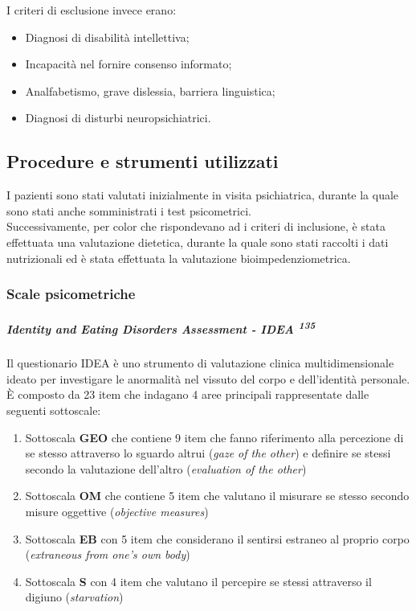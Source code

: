 \documentclass[12pt]{article}
\makeatletter
\newcommand{\cslcitation}[2]
 {\protect\hyper@linkstart{cite}{citeproc_bib_item_#1}#2\hyper@linkend}
\makeatother
\begin{document}
I criteri di esclusione invece erano:
\begin{itemize}
\item Diagnosi di disabilità intellettiva;
\item Incapacità nel fornire consenso informato;
\item Analfabetismo, grave dislessia, barriera linguistica;
\item Diagnosi di disturbi neuropsichiatrici.
\end{itemize}
\subsection{Procedure e strumenti utilizzati}
\label{sec:orgf8ba668}
I pazienti sono stati valutati inizialmente in visita psichiatrica, durante la quale sono stati anche somministrati i test psicometrici.\\
Successivamente, per color che rispondevano ad i criteri di inclusione, è stata effettuata una valutazione dietetica, durante la quale sono stati raccolti i dati nutrizionali ed è stata effettuata la valutazione bioimpedenziometrica.
\subsubsection{Scale psicometriche}
\label{sec:org03ea835}
\subparagraph{Identity and Eating Disorders Assessment - IDEA \textsuperscript{\cslcitation{135}{135}}}
\label{sec:org3f22a33}
Il questionario IDEA è uno strumento di valutazione clinica multidimensionale ideato per investigare le anormalità nel vissuto del corpo e dell'identità personale.
È composto da 23 item che indagano 4 aree principali rappresentate dalle seguenti sottoscale:
\begin{enumerate}
\item Sottoscala \textbf{GEO} che contiene 9 item che fanno riferimento alla percezione di se stesso attraverso lo sguardo altrui (\emph{gaze of the other}) e definire se stessi secondo la valutazione dell'altro (\emph{evaluation of the other})
\item Sottoscala \textbf{OM} che contiene 5 item che valutano il misurare se stesso secondo misure oggettive (\emph{objective measures})
\item Sottoscala \textbf{EB} con 5 item che considerano il sentirsi estraneo al proprio corpo (\emph{extraneous from one's own body})
\item Sottoscala \textbf{S} con 4 item che valutano il percepire se stessi attraverso il digiuno (\emph{starvation})
\end{enumerate}
\end{document}
